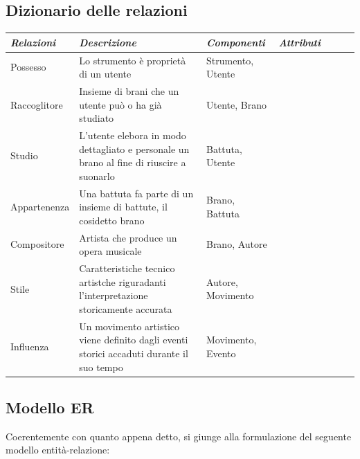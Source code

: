 \documentclass{article}
\begin{document}
    \subsection{Dizionario delle relazioni}

    \begin{tabular}{l p{5cm} p{3cm} p{2cm} l l l}
        \toprule
        \textbf{\textit{Relazioni}} & \textbf{\textit{Descrizione}} & \textbf{\textit{Componenti}} & \textbf{\textit{Attributi}} \\
        \midrule
        Possesso & Lo strumento è proprietà di un utente & Strumento, \newline Utente & \\
        \midrule
        Raccoglitore & Insieme di brani che un utente può o ha già studiato & Utente, \newline Brano & \\
        \midrule
        Studio & L'utente elebora in modo dettagliato e personale un brano al fine di riuscire a suonarlo & Battuta, \newline Utente & \\
        \midrule
        Appartenenza & Una battuta fa parte di un insieme di battute, il cosidetto brano & Brano, \newline Battuta & \\
        \midrule
        Compositore & Artista che produce un opera musicale & Brano, \newline Autore & \\
        \midrule
        Stile & Caratteristiche tecnico artistche riguradanti l'interpretazione storicamente accurata & Autore, \newline Movimento \\
        \midrule
        Influenza & Un movimento artistico viene definito dagli eventi storici accaduti durante il suo tempo & Movimento, \newline Evento & \\
        \bottomrule
    \end{tabular}

    \newpage

    \subsection{Modello ER}

    Coerentemente con quanto appena detto, si giunge alla formulazione del seguente modello entità-relazione:
\end{document}
